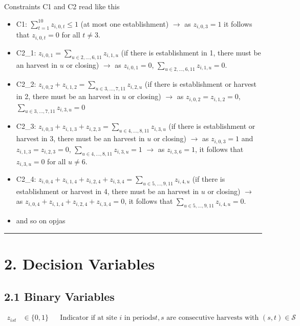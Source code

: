 \documentclass[
  11pt,
  11pt,
  a4paper]{article}
\providecommand{\tightlist}{%
  \setlength{\itemsep}{0pt}\setlength{\parskip}{0pt}}
\begin{document}
Constraints C1 and C2 read like this

\begin{itemize}
\tightlist
\item
  C1: \(\sum_{t=1}^{10} z_{i,0,t} \leq 1\) (at most one establishment)
  \(\rightarrow\) as \(z_{i,0,3}=1\) it follows that \(z_{i,0,t}=0\) for
  all \(t \neq 3\).
\item
  C2\_1: \(z_{i,0,1} = \sum_{u \in 2,...,6,11} z_{i,1,u}\) (if there is
  establishment in 1, there must be an harvest in \(u\) or closing)
  \(\rightarrow\) as \(z_{i,0,1}=0\),
  \(\sum_{u\in 2,...,6,11} z_{i,1,u} = 0\).
\item
  C2\_2: \(z_{i,0,2} + z_{i,1,2} = \sum_{u \in 3,...,7,11} z_{i,2,u}\)
  (if there is establishment or harvest in 2, there must be an harvest
  in \(u\) or closing) \(\rightarrow\) as \(z_{i,0,2}=z_{i,1,2}=0\),
  \(\sum_{u\in 3,...,7,11} z_{i,3,u} = 0\)
\item
  C2\_3:
  \(z_{i,0,3} + z_{i,1,3} + z_{i,2,3} = \sum_{u \in 4,...,8,11} z_{i,3,u}\)
  (if there is establishment or harvest in 3, there must be an harvest
  in \(u\) or closing) \(\rightarrow\) as \(z_{i,0,3}=1\) and
  \(z_{i,1,3}=z_{i,2,3}=0\), \(\sum_{u\in 4,...,8,11} z_{i,3,u} = 1\)
  \(\rightarrow\) as \(z_{i,3,6}=1\), it follows that \(z_{i,3,u}=0\)
  for all \(u \neq 6\).
\item
  C2\_4:
  \(z_{i,0,4} + z_{i,1,4} + z_{i,2,4} + z_{i,3,4} = \sum_{u \in 5,...,9,11} z_{i,4,u}\)
  (if there is establishment or harvest in 4, there must be an harvest
  in \(u\) or closing) \(\rightarrow\) as
  \(z_{i,0,4} + z_{i,1,4} + z_{i,2,4} + z_{i,3,4} =0\), it follows that
  \(\sum_{u \in 5,...,9,11} z_{i,4,u}=0\).
\item
  and so on opjas
\end{itemize}

\begin{center}\rule{0.5\linewidth}{0.5pt}\end{center}

\section{2. Decision Variables}\label{decision-variables}

\subsection{2.1 Binary Variables}\label{binary-variables}

\begin{align}
z_{ist} & \in \{0, 1\} && \text{Indicator if at site } i \text{ in periods} t,s \text{ are consecutive harvests with } (s,t) \in \mathcal{S}
\end{align}
\end{document}
